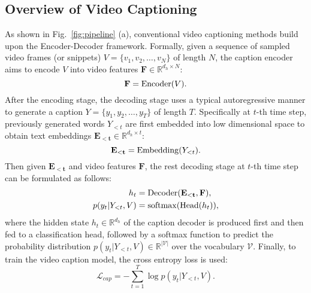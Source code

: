 \documentclass[runningheads]{llncs}
\begin{document}
\subsection{Overview of Video Captioning}
\label{sec:overview_of_vc}
As shown in Fig.~\ref{fig:pipeline} (a), conventional video captioning methods build upon the Encoder-Decoder framework. Formally, given a sequence of sampled video frames (or snippets) $V = \{v_1, v_2, \dots, v_N\}$ of length $N$, the caption encoder aims to encode $V$ into video features $\mathbf{F} \in \mathbb{R}^{d_h\times N}$:
\begin{equation}
\label{eq:encoding}
   \mathbf{F} = {\rm Encoder}(V).
\end{equation}
After the encoding stage, the decoding stage uses a typical autoregressive manner to generate a caption $Y = \{y_1, y_2, \dots, y_T\}$ of length $T$. Specifically at $t$-th time step, previously generated words $Y_{<t}$ are first embedded into low dimensional space to obtain text embeddings $\mathbf{E_{<t}} \in \mathbb{R}^{d_h\times t}$:
\begin{equation}
\label{eq:embedding}
\mathbf{E_{<t}} = {\rm Embedding}(Y_{<t}).
\end{equation}
Then given $\mathbf{E_{<t}}$ and video features $\mathbf{F}$, the rest decoding stage at $t$-th time step can be formulated as follows:
\begin{equation}
\label{eq:decoding}
\begin{split}
    h_t &= {\rm Decoder}(\mathbf{E_{<t}}, \mathbf{F}), \\
    p(y_{t}|Y_{<t}, V) &= {\rm softmax}({\rm Head}(h_t)),
\end{split}
\end{equation}
where the hidden state $h_t \in \mathbb{R}^{d_h}$ of the caption decoder is produced first and then fed to a classification head, followed by a softmax function to predict the probability distribution $p(y_{t}|Y_{<t}, V) \in \mathbb{R}^{|\mathcal{V}|}$ over the vocabulary $\mathcal{V}$. Finally, to train the video caption model, the cross entropy loss is used:
\begin{equation}
\label{eq:train_cap}
   \mathcal{L}_{cap} = - \sum_{t=1}^{T} \log p(y_{t}|Y_{<t}, V).
\end{equation}
\end{document}
